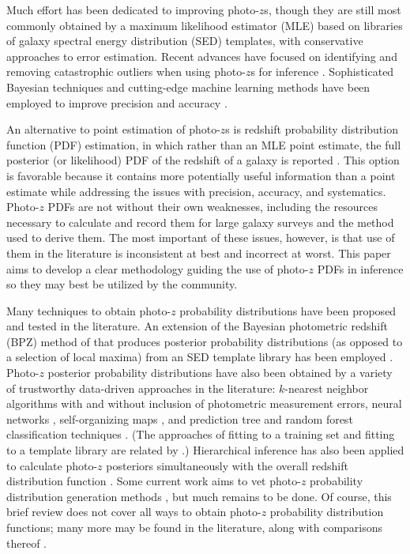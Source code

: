 \documentclass[preprint]{aastex}
\begin{document}
Much effort has been dedicated to improving photo-$z$s, though they are still 
most commonly obtained by a maximum likelihood estimator (MLE) based on 
libraries of galaxy spectral energy distribution (SED) templates, with 
conservative approaches to error estimation.  Recent advances have focused on 
identifying and removing catastrophic outliers when using photo-$z$s for 
inference \citep{Gorecki2014}.  Sophisticated Bayesian techniques and 
cutting-edge machine learning methods have been employed to improve precision 
\citep{Carliles2010} and accuracy \citep{Sadeh2015}. 

An alternative to point estimation of photo-$z$s is redshift probability 
distribution function (PDF) estimation, in which rather than an MLE point 
estimate, the full posterior (or likelihood) PDF of the redshift of a galaxy is 
reported \citep{Koo1999}.  This option is favorable because it contains more 
potentially useful information than a point estimate while addressing the 
issues with precision, accuracy, and systematics.  Photo-$z$ PDFs are not 
without their own weaknesses, including the resources necessary to calculate 
and record them for large galaxy surveys \citep{CarrascoKind2014} and the 
method used to derive them.  The most important of these issues, however, is 
that use of them in the literature is inconsistent at best and incorrect at 
worst.  This paper aims to develop a clear methodology guiding the use of 
photo-$z$ PDFs in inference so they may best be utilized by the community.

Many techniques to obtain photo-$z$ probability distributions have been 
proposed and tested in the literature.  An extension of the Bayesian 
photometric redshift (BPZ) method of \citet{Benitez2000} that produces 
posterior probability distributions (as opposed to a selection of local maxima) 
from an SED template library has been employed \citep{Hildebrandt2012, 
Kelly2014, Lopez-Sanjuan2015}.  Photo-$z$ posterior probability distributions 
have also been obtained by a variety of trustworthy data-driven approaches in 
the literature: $k$-nearest neighbor algorithms with \citep{Ball2008} and 
without \citep{Sheldon2012} inclusion of photometric measurement errors, neural 
networks \citep{Bonnett2015a}, self-organizing maps \citep{CarrascoKind2014a}, 
and prediction tree and random forest classification techniques 
\citep{Carliles2010, CarrascoKind2013}.  (The approaches of fitting to a 
training set and fitting to a template library are related by 
\citet{Budavari2009}.)  Hierarchical inference has also been applied to 
calculate photo-$z$ posteriors simultaneously with the overall redshift 
distribution function \citep{Leistedt2016}.  Some current work aims to vet 
photo-$z$ probability distribution generation methods \citep{Wittman2016}, but 
much remains to be done.  Of course, this brief review does not cover all ways 
to obtain photo-$z$ probability distribution functions; many more may be found 
in the literature, along with comparisons thereof \citep{Hildebrandt2010, 
Dahlen2013, Sanchez2013, Bonnett2015}.
\end{document}
